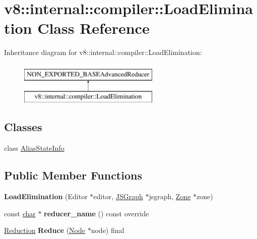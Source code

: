 \hypertarget{classv8_1_1internal_1_1compiler_1_1LoadElimination}{}\section{v8\+:\+:internal\+:\+:compiler\+:\+:Load\+Elimination Class Reference}
\label{classv8_1_1internal_1_1compiler_1_1LoadElimination}
Inheritance diagram for v8\+:\+:internal\+:\+:compiler\+:\+:Load\+Elimination\+:\begin{figure}[H]
\begin{center}
\leavevmode
\includegraphics[height=2.000000cm]{classv8_1_1internal_1_1compiler_1_1LoadElimination}
\end{center}
\end{figure}
\subsection*{Classes}
\begin{DoxyCompactItemize}
\item 
class \mbox{\hyperlink{classv8_1_1internal_1_1compiler_1_1LoadElimination_1_1AliasStateInfo}{Alias\+State\+Info}}
\end{DoxyCompactItemize}
\subsection*{Public Member Functions}
\begin{DoxyCompactItemize}
\item 
\mbox{\label{classv8_1_1internal_1_1compiler_1_1LoadElimination_acf6c90a8624f2cf78a1f206bb20246a2}} 
{\bfseries Load\+Elimination} (Editor $\ast$editor, \mbox{\hyperlink{classv8_1_1internal_1_1compiler_1_1JSGraph}{J\+S\+Graph}} $\ast$jsgraph, \mbox{\hyperlink{classv8_1_1internal_1_1Zone}{Zone}} $\ast$zone)
\item 
\mbox{\label{classv8_1_1internal_1_1compiler_1_1LoadElimination_a1c7791a137110601768176f07035bd8f}} 
const \mbox{\hyperlink{classchar}{char}} $\ast$ {\bfseries reducer\+\_\+name} () const override
\item 
\mbox{\label{classv8_1_1internal_1_1compiler_1_1LoadElimination_ae7f1b6c79aa0c43f7b4c393465596537}} 
\mbox{\hyperlink{classv8_1_1internal_1_1compiler_1_1Reduction}{Reduction}} {\bfseries Reduce} (\mbox{\hyperlink{classv8_1_1internal_1_1compiler_1_1Node}{Node}} $\ast$node) final
\end{DoxyCompactItemize}


